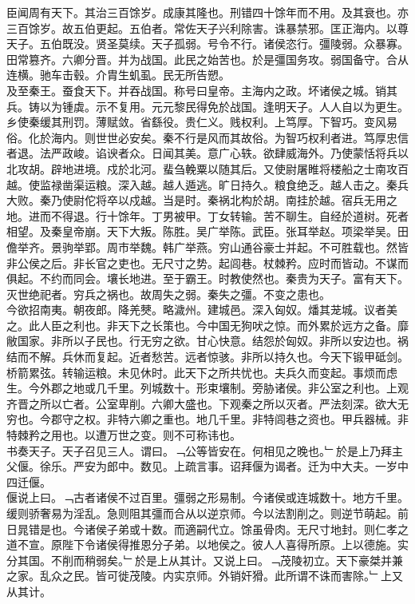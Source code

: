 \documentclass{zhvt-classic}
\begin{document}
\hspace*{2em}臣闻周有天下。其治三百馀岁。成康其隆也。刑错四十馀年而不用。及其衰也。亦三百馀岁。故五伯更起。五伯者。常佐天子兴利除害。诛暴禁邪。匡正海内。以尊天子。五伯既没。贤圣莫续。天子孤弱。号令不行。诸侯恣行。彊陵弱。众暴寡。田常篡齐。六卿分晋。并为战国。此民之始苦也。於是彊国务攻。弱国备守。合从连横。驰车击毂。介胄生虮虱。民无所告愬。\\
\hspace*{2em}及至秦王。蚕食天下。并吞战国。称号曰皇帝。主海内之政。坏诸侯之城。销其兵。铸以为锺虡。示不复用。元元黎民得免於战国。逢明天子。人人自以为更生。乡使秦缓其刑罚。薄赋敛。省繇役。贵仁义。贱权利。上笃厚。下智巧。变风易俗。化於海内。则世世必安矣。秦不行是风而其故俗。为智巧权利者进。笃厚忠信者退。法严政峻。谄谀者众。日闻其美。意广心轶。欲肆威海外。乃使蒙恬将兵以北攻胡。辟地进境。戍於北河。蜚刍輓粟以随其后。又使尉屠睢将楼船之士南攻百越。使监禄凿渠运粮。深入越。越人遁逃。旷日持久。粮食绝乏。越人击之。秦兵大败。秦乃使尉佗将卒以戍越。当是时。秦祸北构於胡。南挂於越。宿兵无用之地。进而不得退。行十馀年。丁男被甲。丁女转输。苦不聊生。自经於道树。死者相望。及秦皇帝崩。天下大叛。陈胜。吴广举陈。武臣。张耳举赵。项梁举吴。田儋举齐。景驹举郢。周市举魏。韩广举燕。穷山通谷豪士并起。不可胜载也。然皆非公侯之后。非长官之吏也。无尺寸之势。起闾巷。杖棘矜。应时而皆动。不谋而俱起。不约而同会。壤长地进。至于霸王。时教使然也。秦贵为天子。富有天下。灭世绝祀者。穷兵之祸也。故周失之弱。秦失之彊。不变之患也。\\
\hspace*{2em}今欲招南夷。朝夜郎。降羌僰。略濊州。建城邑。深入匈奴。燔其茏城。议者美之。此人臣之利也。非天下之长策也。今中国无狗吠之惊。而外累於远方之备。靡敝国家。非所以子民也。行无穷之欲。甘心快意。结怨於匈奴。非所以安边也。祸结而不解。兵休而复起。近者愁苦。远者惊骇。非所以持久也。今天下锻甲砥剑。桥箭累弦。转输运粮。未见休时。此天下之所共忧也。夫兵久而变起。事烦而虑生。今外郡之地或几千里。列城数十。形束壤制。旁胁诸侯。非公室之利也。上观齐晋之所以亡者。公室卑削。六卿大盛也。下观秦之所以灭者。严法刻深。欲大无穷也。今郡守之权。非特六卿之重也。地几千里。非特闾巷之资也。甲兵器械。非特棘矜之用也。以遭万世之变。则不可称讳也。\\
\hspace*{2em}书奏天子。天子召见三人。谓曰。﹁公等皆安在。何相见之晚也。﹂於是上乃拜主父偃。徐乐。严安为郎中。数见。上疏言事。诏拜偃为谒者。迁为中大夫。一岁中四迁偃。\\
\hspace*{2em}偃说上曰。﹁古者诸侯不过百里。彊弱之形易制。今诸侯或连城数十。地方千里。缓则骄奢易为淫乱。急则阻其彊而合从以逆京师。今以法割削之。则逆节萌起。前日晁错是也。今诸侯子弟或十数。而適嗣代立。馀虽骨肉。无尺寸地封。则仁孝之道不宣。原陛下令诸侯得推恩分子弟。以地侯之。彼人人喜得所原。上以德施。实分其国。不削而稍弱矣。﹂於是上从其计。又说上曰。﹁茂陵初立。天下豪桀并兼之家。乱众之民。皆可徙茂陵。内实京师。外销奸猾。此所谓不诛而害除。﹂上又从其计。\\
\end{document}
